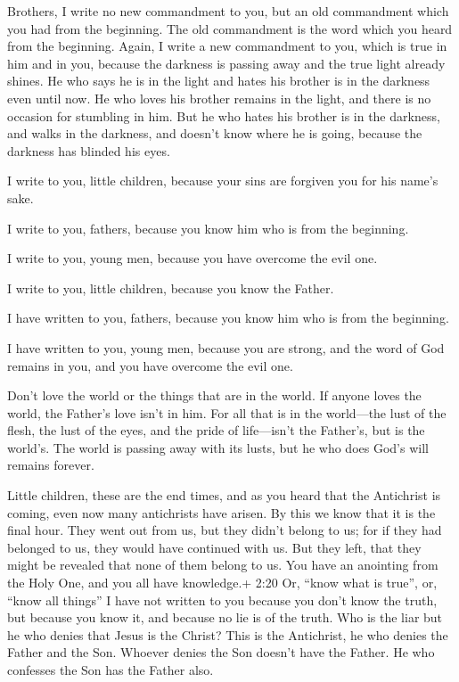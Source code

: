  Brothers, I write no new commandment to you, but an old
commandment which you had from the beginning. The old commandment is the
word which you heard from the beginning.  Again, I write a
new commandment to you, which is true in him and in you, because the
darkness is passing away and the true light already shines. 
He who says he is in the light and hates his brother is in the darkness
even until now.  He who loves his brother remains in the
light, and there is no occasion for stumbling in him.  But
he who hates his brother is in the darkness, and walks in the darkness,
and doesn't know where he is going, because the darkness has blinded his
eyes.

 I write to you, little children, because your sins are
forgiven you for his name's sake.

 I write to you, fathers, because you know him who is from
the beginning.

I write to you, young men, because you have overcome the evil one.

I write to you, little children, because you know the Father.

 I have written to you, fathers, because you know him who
is from the beginning.

I have written to you, young men, because you are strong, and the word
of God remains in you, and you have overcome the evil one.

 Don't love the world or the things that are in the world.
If anyone loves the world, the Father's love isn't in him. 
For all that is in the world---the lust of the flesh, the lust of the
eyes, and the pride of life---isn't the Father's, but is the world's.
 The world is passing away with its lusts, but he who does
God's will remains forever.

 Little children, these are the end times, and as you heard
that the Antichrist is coming, even now many antichrists have arisen. By
this we know that it is the final hour.  They went out from
us, but they didn't belong to us; for if they had belonged to us, they
would have continued with us. But they left, that they might be revealed
that none of them belong to us.  You have an anointing from
the Holy One, and you all have knowledge.+ 2:20 Or, ``know what is
true'', or, ``know all things''  I have not written to you
because you don't know the truth, but because you know it, and because
no lie is of the truth.  Who is the liar but he who denies
that Jesus is the Christ? This is the Antichrist, he who denies the
Father and the Son.  Whoever denies the Son doesn't have
the Father. He who confesses the Son has the Father also.

